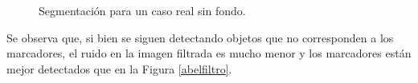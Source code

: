 \begin{figure}[ht!]
        \hspace{-1cm}
         \hspace{1 mm}
  \caption{Segmentación para un caso real sin fondo.}
      \label{ejemploabelsf}
\end{figure}

Se observa que, si bien se siguen detectando objetos que no corresponden a los marcadores, el ruido en la imagen filtrada es mucho menor y los marcadores están mejor detectados que en la Figura \ref{abelfiltro}.

